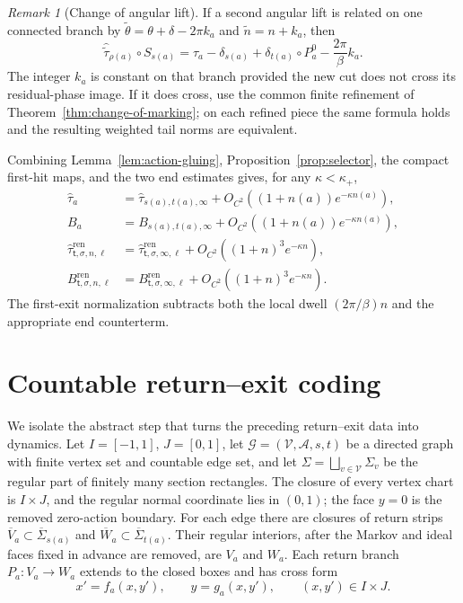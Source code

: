 \documentclass[11pt]{amsart}
\numberwithin{equation}{section}
\theoremstyle{definition}
\theoremstyle{remark}
\newtheorem{remark}[theorem]{Remark}
\newcommand{\cV}{\mathcal V}
\newcommand{\cA}{\mathcal A}
\newcommand{\cG}{\mathcal G}
\begin{document}
\begin{remark}[Change of angular lift]
If a second angular lift is related on one connected branch by
$\widetilde\theta=\theta+\delta-2\pi k_a$ and
$\widetilde n=n+k_a$, then
\begin{equation}\label{eq:winding-change-covariance}
 \widehat{\widetilde\tau}_{\rho(a)}\circ S_{s(a)}
 =\widehat\tau_a-\delta_{s(a)}+\delta_{t(a)}\circ P_a^0
       -\frac{2\pi}{\beta}k_a.
\end{equation}
The integer $k_a$ is constant on that branch provided the new cut does not
cross its residual-phase image.  If it does cross, use the common finite
refinement of Theorem~\ref{thm:change-of-marking}; on each refined piece
the same formula holds and the resulting weighted tail norms are
equivalent.
\end{remark}

Combining Lemma~\ref{lem:action-gluing}, Proposition~\ref{prop:selector},
the compact first-hit maps, and the two end estimates gives, for any
$\kappa<\kappa_+$,
\begin{align}
 \widehat\tau_{a}
  &=\widehat\tau_{s(a),t(a),\infty}
       +O_{C^2}((1+n(a))e^{-\kappa n(a)}),
 \label{eq:return-potentials-time}\\
 B_a&=B_{s(a),t(a),\infty}
       +O_{C^2}((1+n(a))e^{-\kappa n(a)}),
 \label{eq:return-potentials}\\
 \widehat\tau_{\mathsf t,\sigma,n,\ell}^{\mathrm{ren}}
  &=\widehat\tau_{\mathsf t,\sigma,\infty,\ell}^{\mathrm{ren}}
       +O_{C^2}((1+n)^3e^{-\kappa n}),
 \label{eq:terminal-potentials-time}\\
 B_{\mathsf t,\sigma,n,\ell}^{\mathrm{ren}}
  &=B_{\mathsf t,\sigma,\infty,\ell}^{\mathrm{ren}}
       +O_{C^2}((1+n)^3e^{-\kappa n}).
 \label{eq:terminal-potentials}
\end{align}
The first-exit normalization subtracts both the local dwell
$(2\pi/\beta)n$ and the appropriate end counterterm.

\section{Countable return--exit coding}
\label{sec:coding}

We isolate the abstract step that turns the preceding return--exit data
into dynamics.
Let $I=[-1,1]$, $J=[0,1]$, let $\cG=(\cV,\cA,s,t)$ be a directed graph
with finite vertex set and countable edge set, and let
$\Sigma=\bigsqcup_{v\in\cV}\Sigma_v$ be the regular part of finitely many
section rectangles.  The closure of every vertex chart is $I\times J$,
and the regular normal coordinate lies in $(0,1)$; the face $y=0$ is the
removed zero-action boundary.  For each
edge there are closures of return strips
$\overline V_a\subset\overline\Sigma_{s(a)}$ and
$\overline W_a\subset\overline\Sigma_{t(a)}$.  Their regular interiors, after
the Markov and ideal faces fixed in advance are removed, are $V_a$ and
$W_a$.
Each return branch $P_a:V_a\to W_a$ extends to the closed boxes and has
cross form
\begin{equation}\label{eq:abstract-cross}
 x'=f_a(x,y'),\qquad y=g_a(x,y'),
 \qquad (x,y')\in I\times J.
\end{equation}
\end{document}
